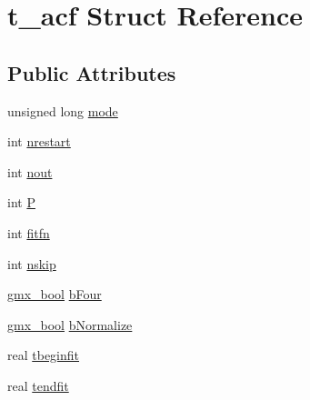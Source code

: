 \hypertarget{structt__acf}{\section{t\-\_\-acf \-Struct \-Reference}
\label{structt__acf}
}
\subsection*{\-Public \-Attributes}
\begin{DoxyCompactItemize}
\item 
unsigned long \hyperlink{structt__acf_a20b321cbf2033f4716be094de5ad6db1}{mode}
\item 
int \hyperlink{structt__acf_a53fa8d88d63bd167fc42f84656ffdfcc}{nrestart}
\item 
int \hyperlink{structt__acf_aed99bd0c5456698897ea87a0a89fe8cf}{nout}
\item 
int \hyperlink{structt__acf_af965bb59c4df4c67df66a4c603db7aa9}{\-P}
\item 
int \hyperlink{structt__acf_a7da7fb08d99d1b90e3b5abaf0477d03d}{fitfn}
\item 
int \hyperlink{structt__acf_acdfd80db66ab81e382954239ca574bef}{nskip}
\item 
\hyperlink{include_2types_2simple_8h_a8fddad319f226e856400d190198d5151}{gmx\-\_\-bool} \hyperlink{structt__acf_a2a0eecf190d433079fb30e63928a303f}{b\-Four}
\item 
\hyperlink{include_2types_2simple_8h_a8fddad319f226e856400d190198d5151}{gmx\-\_\-bool} \hyperlink{structt__acf_ab1ed85cb36b2080780b02f65fe23fa43}{b\-Normalize}
\item 
real \hyperlink{structt__acf_a849ecbef2ea6fcc67d85d0cd6984d9c5}{tbeginfit}
\item 
real \hyperlink{structt__acf_aad6bdd76f54c9a08ac9ba24a9df91a66}{tendfit}
\end{DoxyCompactItemize}


